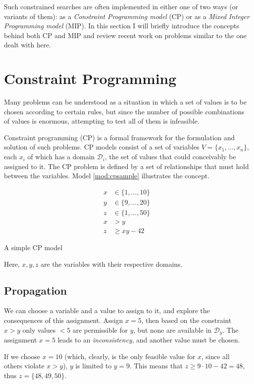 \documentclass[13pt, letterpaper, oneside]{book}
\begin{document}
Such constrained searches are often implemented in either one of two ways (or
variants of them): as a \textit{Constraint Programming model} (CP) or as a
\textit{Mixed Integer Programming model} (MIP). In this section I will briefly
introduce the concepts behind both CP and MIP and review recent work on problems
similar to the one dealt with here.

\section{Constraint Programming}

Many problems can be understood as a situation in which a set of values is to be
chosen according to certain rules, but since the number of possible combinations
of values is enormous, attempting to test all of them is infeasible.


Constraint programming (CP) is a formal framework for the formulation and
solution of such problems. CP models consist of a set of variables $V = \{x_1,
\dots, x_n\}$, each $x_i$ of which has a domain $\mathcal{D}_i$, the set of
values that could conceivably be assigned to it. The CP problem is defined by a
set of relationships that must hold between the variables. Model
\ref{mod:cpsample} illustrates the concept.

\begin{model}
\begin{align}
x &\in \{1,\dots,10\}\\
y &\in \{9,\dots,20\}\\
z &\in \{1,\dots,50\}\\
x &> y\\
z &\geq xy - 42
\end{align}
\caption{A simple CP model}
\label{mod:cpsample}
\end{model}
Here, $x, y, z$ are the variables with their respective domains.

\subsection{Propagation}
We can choose a variable and a value to assign to it, and explore the
consequences of this assignment. Assign $x = 5$, then based on the constraint $x
> y$ only values $< 5$ are permissible for $y$, but none are available in
$\mathcal{D}_y$. The assignment $x = 5$ leads to an \textit{inconsistency}, and
another value must be chosen.
 
If we choose $x = 10$ (which, clearly, is the only feasible value for $x$, since all
others violate $x > y$), $y$ is limited to $y = 9$. This means that $z \geq 9 \cdot
10 - 42 = 48$, thus $z = \{48, 49, 50\}$.
 
\end{document}
